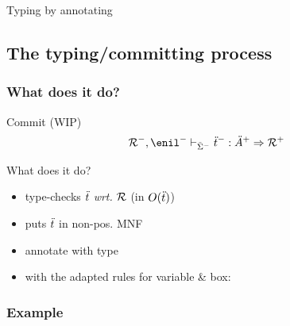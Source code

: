 \documentclass[ignorenonframetext,red]{beamer}
\begin{document}
\begin{frame}{Typing by annotating}
  
\end{frame}

\subsection{The typing/committing process}

\subsubsection{What does it do?}

\begin{frame}{\textsf{Commit} (WIP)}
  \inXLF
  {\Large \[ \jindex{\msi^-}{\pair{\mr^-}{\enil^-}}{\typ{\mo^-}{\mf^+}} \To{\mr^+} \]}
  \begin{block}{What does it do?}
    \begin{itemize}
    \item type-checks $\mo$ \emph{wrt.} $\mr$ (in $O(\mo)$)
    \item puts $\mo$ in non-pos. \textsf{MNF}
    \item annotate with type
    \item with the adapted rules for variable \& box:
      \small
      \begin{mathpar}

      \end{mathpar}
    \end{itemize}
  \end{block}
\end{frame}

\subsubsection{Example}
\end{document}
